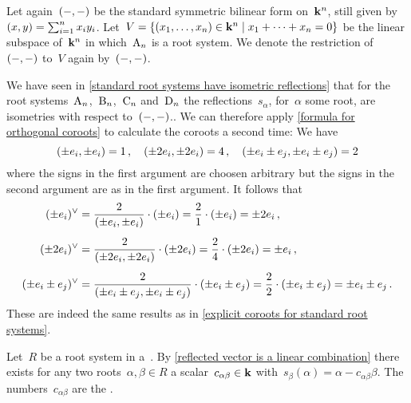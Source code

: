 \begin{examples}
  Let again~$(-,-)$ be the standard symmetric bilinear form on~$\mathbf{k}^n$, still given by~$(x,y) = \sum_{i=1}^n x_i y_i$.
  Let~$V = \{ (x_1, \dotsc, x_n) \in \kf^n \suchthat x_1 + \dotsb + x_n = 0 \}$ be the linear subspace of~$\mathbf{k}^n$ in which~$\mathrm{A}_n$ is a root system.
  We denote the restriction of~$(-,-)$ to~$V$ again by~$(-,-)$.
  
  We have seen in \cref{standard root systems have isometric reflections} that for the root systems~$\mathrm{A}_n$,~$\mathrm{B}_n$,~$\mathrm{C}_n$ and~$\mathrm{D}_n$ the reflections~$s_\alpha$, for~$\alpha$ some root, are isometries with respect to~$(-,-)$..
  We can therefore apply \cref{formula for orthogonal coroots} to calculate the coroots a second time:  
  We have
  \[
    (\pm e_i,  \pm e_i)
    =
    1 \,,
    \quad
    (\pm 2 e_i, \pm 2 e_i)
    =
    4 \,,
    \quad
    (\pm e_i \pm e_j, \pm e_i \pm e_j)
    =
    2
  \]
  where the signs in the first argument are choosen arbitrary but the signs in the second argument are as in the first argument.
  It follows that
  \begin{align*}
    \check{(\pm e_i)}
    &=
    \frac{2}{\inner{\pm e_i,  \pm e_i}}
    \cdot
    (\pm e_i)
    =
    \frac{2}{1}
    \cdot
    (\pm e_i)
    =
    \pm 2 e_i \,,
    \\[0.5em]
    \check{(\pm 2 e_i)}
    &=
    \frac{2}{\inner{\pm 2 e_i,  \pm 2 e_i}}
    \cdot
    (\pm 2 e_i)
    =
    \frac{2}{4}
    \cdot
    (\pm 2 e_i)
     =
    \pm e_i \,,
    \\[0.5em]
    \check{(\pm e_i \pm e_j)}
    &=
    \frac{2}{\inner{\pm e_i \pm e_j,  \pm e_i \pm e_j}}
    \cdot
    (\pm e_i \pm e_j)
    =
    \frac{2}{2}
    \cdot
    (\pm e_i \pm e_j)
    =
    \pm e_i \pm e_j \,.
  \end{align*}
  These are indeed the same results as in \cref{explicit coroots for standard root systems}.
\end{examples}




\begin{definition}
  Let~$R$ be a root system in a~{\vectorspace{$\kf$}}.
  By \cref{reflected vector is a linear combination} there exists for any two roots~$\alpha, \beta \in R$ a scalar~$c_{\alpha \beta} \in \mathbf{k}$ with~$s_{\beta}(\alpha) = \alpha - c_{\alpha \beta} \beta$.
  The numbers~$c_{\alpha \beta}$ are the .
\end{definition}


